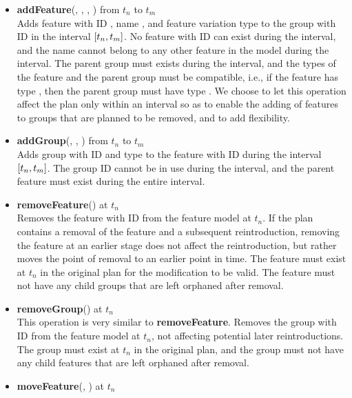 \begin{itemize}
  \item \textbf{addFeature}(, , , ) from $t_n$ to $t_m$\\
      Adds feature with ID , name , and feature variation type  to the group with ID  in the interval $\interval{t_n}{t_m}$. No feature with ID  can exist during the interval, and the name cannot belong to any other feature in the model during the interval. The parent group must exists during the interval, and the types of the feature and the parent group must be compatible, i.e., if the feature has type \mandatory{}, then the parent group must have type \andtype{}. We choose to let this operation affect the plan only within an interval so as to enable the adding of features to groups that are planned to be removed, and to add flexibility.
  \item \textbf{addGroup}(, , ) from $t_n$ to $t_m$\\
      Adds group with ID  and type  to the feature with ID  during the interval $\interval{t_n}{t_m}$. The group ID cannot be in use during the interval, and the parent feature must exist during the entire interval. 
  \item \textbf{removeFeature}() at $t_n$\\
      Removes the feature with ID  from the feature model at $t_n$. If the plan contains a removal of the feature and a subsequent reintroduction, removing the feature at an earlier stage does not affect the reintroduction, but rather moves the point of removal to an earlier point in time. The feature must exist at $t_n$ in the original plan for the modification to be valid. The feature must not have any child groups that are left orphaned after removal. 
  \item \textbf{removeGroup}() at $t_n$\\
      This operation is very similar to \textbf{removeFeature}. Removes the group with ID  from the feature model at $t_n$, not affecting potential later reintroductions. The group must exist at $t_n$ in the original plan, and the group must not have any child features that are left orphaned after removal. 
  \item \textbf{moveFeature}(, ) at $t_n$\\

\end{itemize}
